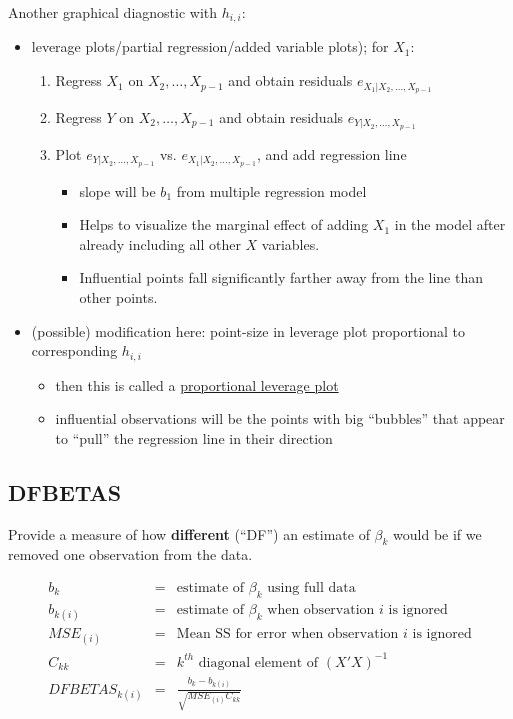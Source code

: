 \documentclass[12pt]{notes}
\begin{document}
\nspace
Another graphical diagnostic with $h_{i,i}$:
\begin{itemize}
 \item leverage plots/partial regression/added variable plots); for $X_1$:
   \begin{enumerate}
     \item Regress $X_1$ on $X_2, \ldots, X_{p-1}$ and obtain residuals $e_{X_1 | X_2, \ldots, X_{p-1}}$
     \item Regress $Y$ on $X_2, \ldots, X_{p-1}$ and obtain residuals $e_{Y | X_2, \ldots, X_{p-1}}$
     \item Plot $e_{Y | X_2, \ldots, X_{p-1}}$ vs. $e_{X_1 | X_2, \ldots, X_{p-1}}$, and add regression line
       \begin{itemize}
         \item slope will be $b_1$ from multiple regression model
         \item Helps to visualize the marginal effect of adding $X_1$ in the model after already including all other $X$ variables. 
         \item Influential points fall significantly farther away from the line than other points. 
       \end{itemize}
   \end{enumerate}
 \item (possible) modification here: point-size in leverage plot proportional to corresponding $h_{i,i}$ 
   \begin{itemize}
     \item then this is called a \underline{proportional leverage plot}
     \item influential observations will be the points with big ``bubbles'' that appear to ``pull''
      the regression line in their direction
   \end{itemize}
\end{itemize}

\subsection{DFBETAS} 
Provide a measure of how \textbf{different} (``DF'') an estimate of $\beta_k$ would be if we removed one observation from the data. 

    \begin{eqnarray}
       b_k & = & \mbox{estimate of $\beta_k$ using full data} \nonumber \\
       b_{k(i)} & = & \mbox{estimate of $\beta_k$ when observation $i$ is ignored} \nonumber \\
       MSE_{(i)} & = & \mbox{Mean SS for error when observation $i$ is ignored} \nonumber \\
       C_{kk} & = & \mbox{$k^{th}$ diagonal element of } \left( {X}' {X} \right) ^{-1} \nonumber\\
       DFBETAS_{k(i)} & = & \frac{b_k-b_{k(i)}}{\sqrt{MSE_{(i)}C_{kk}}} \nonumber
     \end{eqnarray}
     
\end{document}
